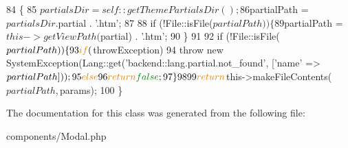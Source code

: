 \begin{DoxyCode}
84     \{   
85         $partialsDir = self::getThemePartialsDir();
86         $partialPath = $partialsDir . $partial . \textcolor{stringliteral}{'.htm'};
87 
88         \textcolor{keywordflow}{if} (!File::isFile($partialPath)) \{
89             $partialPath = $this->getViewPath($partial) . \textcolor{stringliteral}{'.htm'};
90         \}
91 
92         \textcolor{keywordflow}{if} (!File::isFile($partialPath)) \{
93             \textcolor{keywordflow}{if} ($throwException)
94                 \textcolor{keywordflow}{throw} \textcolor{keyword}{new} SystemException(Lang::get(\textcolor{stringliteral}{'backend::lang.partial.not\_found'}, [\textcolor{stringliteral}{'name'} => 
      $partialPath]));
95             \textcolor{keywordflow}{else}
96                 \textcolor{keywordflow}{return} \textcolor{keyword}{false};
97         \}   
98 
99         \textcolor{keywordflow}{return} $this->makeFileContents($partialPath, $params);
100     \}   
\end{DoxyCode}


The documentation for this class was generated from the following file\-:\begin{DoxyCompactItemize}
\item 
components/Modal.\-php\end{DoxyCompactItemize}
